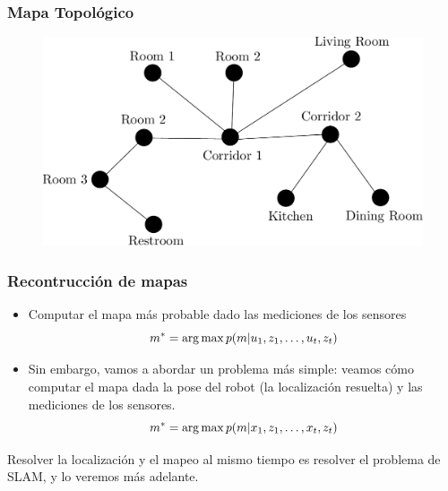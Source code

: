 \begin{frame}
	\frametitle{Mapa Topológico}
	
	\begin{figure}
		\includegraphics[width=0.8\columnwidth]{./images/topological_map.pdf}
	\end{figure}
	
\end{frame}

\begin{frame}
    \frametitle{Recontrucción de mapas}
    
    \begin{itemize}
        \item Computar el mapa más probable dado las mediciones de los sensores
        \begin{equation*}
            m^{*} = \operatorname*{arg\,max} p(m | u_{1}, z_{1}, \dots, u_{t}, z_{t})
        \end{equation*}
        \item Sin embargo, vamos a abordar un problema más simple: veamos cómo computar el mapa dada la pose del robot (la localización resuelta) y las mediciones de los sensores.
        \begin{equation*}
            m^{*} = \operatorname*{arg\,max} p(m | x_{1}, z_{1}, \dots, x_{t}, z_{t})
        \end{equation*}
    \end{itemize}

    \alert{Resolver la localización y el mapeo al mismo tiempo es resolver el problema de SLAM, y lo veremos más adelante.}
    
\end{frame}

